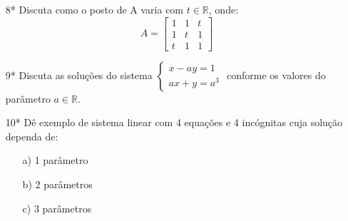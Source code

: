 \documentclass[a4paper]{article}
\newtheorem{theorem}{Theorem}[section]
\newenvironment{proof}[1][Proof]{\begin{trivlist}
\item[\hskip \labelsep {\bfseries #1}]}{\end{trivlist}}
\begin{document}
\begin{itemize}
\item[8*] Discuta como o posto de A varia com $t\in \mathbb{R}$, onde:
$$
A=\left[\begin{array}{ccc}
1&1&t\\1&t&1\\t&1&1
\end{array}\right]
$$
\item[9*] Discuta as soluções do sistema
$ \left\{
\begin{array}{ll}
\displaystyle x - ay = 1 \\
\displaystyle ax + y = a^3
\end{array}
\right.
$ conforme os valores do parâmetro $a \in \mathbb{R}.$

\item[10*] Dê exemplo de sistema linear com 4 equações e 4 incógnitas cuja solução dependa de:
\begin{enumerate}
\item[a)] 1 parâmetro
\item[b)] 2 parâmetros
\item[c)] 3 parâmetros
\end{enumerate}

\end{itemize}

%
%
%
%
%
\end{document}
